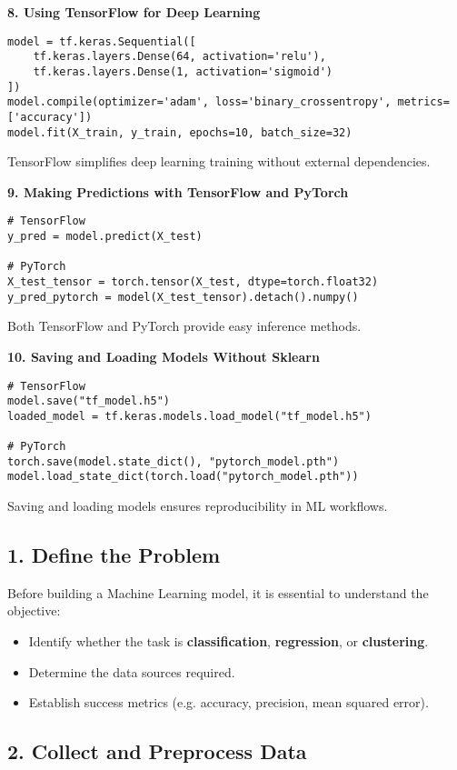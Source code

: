 \textbf{8. Using TensorFlow for Deep Learning}
\begin{verbatim}
model = tf.keras.Sequential([
    tf.keras.layers.Dense(64, activation='relu'),
    tf.keras.layers.Dense(1, activation='sigmoid')
])
model.compile(optimizer='adam', loss='binary_crossentropy', metrics=['accuracy'])
model.fit(X_train, y_train, epochs=10, batch_size=32)
\end{verbatim}
TensorFlow simplifies deep learning training without external dependencies.

\textbf{9. Making Predictions with TensorFlow and PyTorch}
\begin{verbatim}
# TensorFlow
y_pred = model.predict(X_test)

# PyTorch
X_test_tensor = torch.tensor(X_test, dtype=torch.float32)
y_pred_pytorch = model(X_test_tensor).detach().numpy()
\end{verbatim}
Both TensorFlow and PyTorch provide easy inference methods.

\textbf{10. Saving and Loading Models Without Sklearn}
\begin{verbatim}
# TensorFlow
model.save("tf_model.h5")
loaded_model = tf.keras.models.load_model("tf_model.h5")

# PyTorch
torch.save(model.state_dict(), "pytorch_model.pth")
model.load_state_dict(torch.load("pytorch_model.pth"))
\end{verbatim}
Saving and loading models ensures reproducibility in ML workflows.

\subsection{1. Define the Problem}

Before building a Machine Learning model, it is essential to understand the objective:
\begin{itemize}
    \item Identify whether the task is \textbf{classification}, \textbf{regression}, or \textbf{clustering}.
    \item Determine the data sources required.
    \item Establish success metrics (e.g. accuracy, precision, mean squared error).
\end{itemize}

\subsection{2. Collect and Preprocess Data}

